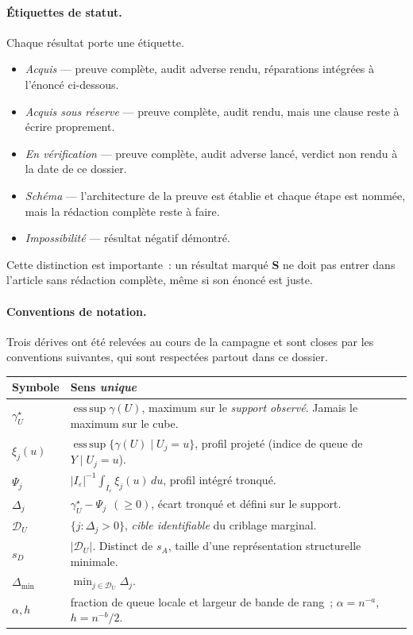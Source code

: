 \documentclass[11pt]{article}
\theoremstyle{plain}
\theoremstyle{definition}
\theoremstyle{remark}
\DeclareMathOperator*{\esssup}{ess\,sup}
\newcommand{\1}{\mathbf 1}
\newcommand{\I}{I_\varepsilon}
\newcommand{\D}{\mathcal D_U}
\newcommand{\gU}{\gamma^\star_U}
\begin{document}
\paragraph{Étiquettes de statut.} Chaque résultat porte une étiquette.

\begin{itemize}[leftmargin=2.2em,itemsep=2pt]
\item[\textbf{A}] \emph{Acquis} --- preuve complète, audit adverse rendu,
réparations intégrées à l'énoncé ci-dessous.
\item[\textbf{A$^-$}] \emph{Acquis sous réserve} --- preuve complète,
audit rendu, mais une clause reste à écrire proprement.
\item[\textbf{V}] \emph{En vérification} --- preuve complète, audit
adverse lancé, verdict non rendu à la date de ce dossier.
\item[\textbf{S}] \emph{Schéma} --- l'architecture de la preuve est
établie et chaque étape est nommée, mais la rédaction complète reste à
faire.
\item[\textbf{I}] \emph{Impossibilité} --- résultat négatif démontré.
\end{itemize}

\noindent
Cette distinction est importante~: un résultat marqué \textbf{S} ne doit
pas entrer dans l'article sans rédaction complète, même si son énoncé
est juste.

\paragraph{Conventions de notation.} Trois dérives ont été relevées au
cours de la campagne et sont closes par les conventions suivantes, qui
sont respectées partout dans ce dossier.

\begin{center}
\begin{tabular}{@{}ll@{}}
\toprule
Symbole & Sens \emph{unique} \\
\midrule
$\gU$ & $\esssup\gamma(U)$, maximum sur le \emph{support observé}.
        Jamais le maximum sur le cube. \\
$\xi_j(u)$ & $\esssup\{\gamma(U)\mid U_j=u\}$, profil projeté
             (indice de queue de $Y\mid U_j=u$). \\
$\Psi_j$ & $|\I|^{-1}\int_{\I}\xi_j(u)\,du$, profil intégré tronqué. \\
$\Delta_j$ & $\gU-\Psi_j\ \ (\ge 0)$, écart tronqué et défini
             sur le support. \\
$\D$ & $\{j:\Delta_j>0\}$, \emph{cible identifiable} du criblage
       marginal. \\
$s_D$ & $|\D|$. Distinct de $s_A$, taille d'une représentation
        structurelle minimale. \\
$\Delta_{\min}$ & $\min_{j\in\D}\Delta_j$. \\
$\alpha,h$ & fraction de queue locale et largeur de bande de rang~;
             $\alpha=n^{-a}$, $h=n^{-b}/2$. \\
\bottomrule
\end{tabular}
\end{center}
\end{document}
